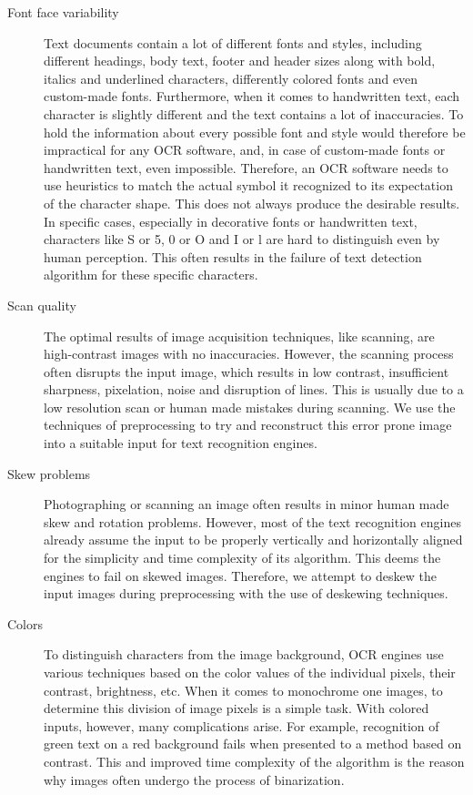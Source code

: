 \begin{description}

\item[Font face variability] Text documents contain a lot of different fonts and styles, including different headings, body text, footer and header sizes along with bold, italics and underlined characters, differently colored fonts and even custom-made fonts. Furthermore, when it comes to handwritten text, each character is slightly different and the text contains a lot of inaccuracies. To hold the information about every possible font and style would therefore be impractical for any OCR software, and, in case of custom-made fonts or handwritten text, even impossible. Therefore, an OCR software needs to use heuristics to match the actual symbol it recognized to its expectation of the character shape. This does not always produce the desirable results. In specific cases, especially in decorative fonts or handwritten text, characters like S or 5, 0 or O and I or l are hard to distinguish even by human perception. This often results in the failure of text detection algorithm for these specific characters.

\item[Scan quality] The optimal results of image acquisition techniques, like scanning, are high-contrast images with no inaccuracies. However, the scanning process often disrupts the input image, which results in low contrast, insufficient sharpness, pixelation, noise and disruption of lines. This is usually due to a low resolution scan or human made mistakes during scanning. We use the techniques of preprocessing to try and reconstruct this error prone image into a suitable input for text recognition engines.

\item[Skew problems] Photographing or scanning an image often results in minor human made skew and rotation problems. However, most of the text recognition engines already assume the input to be properly vertically and horizontally aligned for the simplicity and time complexity of its algorithm. This deems the engines to fail on skewed images. Therefore, we attempt to deskew the input images during preprocessing with the use of deskewing techniques.

\item[Colors] To distinguish characters from the image background, OCR engines use various techniques based on the color values of the individual pixels, their contrast, brightness, etc. When it comes to monochrome one images, to determine this division of image pixels is a simple task. With colored inputs, however, many complications arise. For example, recognition of green text on a red background fails when presented to a method based on contrast. This and improved time complexity of the algorithm is the reason why images often undergo the process of binarization. 

\end{description}

